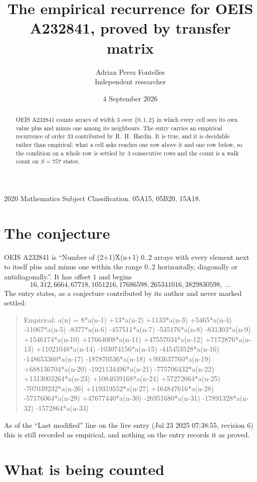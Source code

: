\documentclass[11pt,a4paper]{article}
\title{The empirical recurrence for OEIS A232841, proved by transfer matrix}
\author{Adrian Perez Fontelles\\ \small Independent researcher}
\date{4 September 2026}
\theoremstyle{plain}
\theoremstyle{definition}
\begin{document}
\maketitle

\begin{abstract}
OEIS A232841 counts arrays of width $3$ over $\{0,1,2\}$ in which every cell sees its own value plus and minus one among its neighbours. The entry carries an
empirical recurrence of order $33$ contributed by R.~H.~Hardin. It is true, and it is
decidable rather than empirical: what a cell asks reaches one row above it and one row below, so the
condition on a whole row is settled by $3$ consecutive rows and the count is a walk
count on $S=757$ states.
\end{abstract}

\noindent\small 2020 Mathematics Subject Classification. 05A15, 05B20, 15A18.\normalsize

\section{The conjecture}

OEIS A232841 is ``Number of (2+1)X(n+1) 0..2 arrays with every element next to itself plus and minus one within the range 0..2 horizontally, diagonally or antidiagonally.''. It has offset $1$ and begins
\[
16, 312, 6664, 67718, 1051216, 17686598, 265341016, 3829830598,\ \dots
\]
The entry states, as a conjecture contributed by its author and never marked settled:
\begin{quote}
Empirical: a(n) = 8*a(n-1) +13*a(n-2) +1133*a(n-3) +5465*a(n-4) -11067*a(n-5) -8377*a(n-6) -457511*a(n-7) -535176*a(n-8) -831303*a(n-9) +1546174*a(n-10) +17664008*a(n-11) +47557034*a(n-12) +7172876*a(n-13) +11021048*a(n-14) -103074156*a(n-15) -445453528*a(n-16) -148653360*a(n-17) -187870536*a(n-18) +993637760*a(n-19) +688136704*a(n-20) -1921134496*a(n-21) -775706432*a(n-22) +1313003264*a(n-23) +1084039168*a(n-24) +57272064*a(n-25) -707039232*a(n-26) +119319552*a(n-27) +164847616*a(n-28) -57176064*a(n-29) +47677440*a(n-30) -26951680*a(n-31) -17891328*a(n-32) -1572864*a(n-33)
\end{quote}
As of the ``Last modified'' line on the live entry (Jul 23 2025 07:38:55, revision 6) this is still
recorded as empirical, and nothing on the entry records it as proved.

\section{What is being counted}
\end{document}
